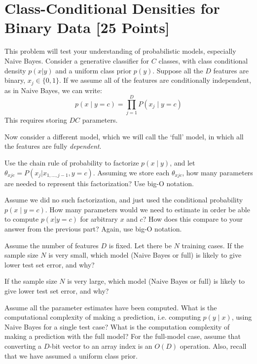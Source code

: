 \section{Class-Conditional Densities for Binary Data [25 Points]}
This problem will test your understanding of probabilistic models, especially Naive Bayes.
Consider a generative classifier for $C$ classes, with class conditional density $p(x | y)$ and a uniform class prior $p(y)$. Suppose all the $D$ features are binary, $x_j \in \{0, 1 \}$. If we assume all of the features are conditionally independent, as in Naive Bayes, we can write:
$$p(x \mid y = c) = \prod_{j=1}^D P(x_j \mid y = c) $$
This requires storing $DC$ parameters. 

Now consider a different model, which we will call the `full' model, in which all the features are fully \textit{dependent}.

\problem[5]Use the chain rule of probability to factorize $p(x \mid y)$, and let $\theta_{xjc} = P(x_j | x_{1, \ldots, j - 1}, y = c)$. Assuming we store each $\theta_{xjc}$, how many parameters are needed to represent this factorization? Use big-O notation.

\begin{solution} %
\end{solution}

\problem[5] Assume we did no such factorization, and just used the conditional probability $p(x \mid y = c)$. How many parameters would we need to estimate in order be able to compute $p(x | y = c)$ for arbitrary $x$ and $c$? How does this compare to your answer from the previous part? Again, use big-O notation.

\begin{solution}
\end{solution}

\problem[2] Assume the number of features $D$ is fixed. Let there be $N$ training cases. If the sample size $N$ is very small, which model (Naive Bayes or full) is likely to give lower test set error, and why?

\begin{solution}
\end{solution}

\problem[2] If the sample size $N$ is very large, which model (Naive Bayes or full) is likely to give lower test set error, and why?
\begin{solution}
\end{solution}

\problem[11] Assume all the parameter estimates have been computed. What is the computational complexity of making a prediction, i.e. computing $p(y \mid x)$, using Naive Bayes for a single test case? What is the computation complexity of making a prediction with the full model? For the full-model case, assume that converting a $D$-bit vector to an array index is an $O(D)$ operation.  Also, recall that we have assumed a uniform class prior. 

